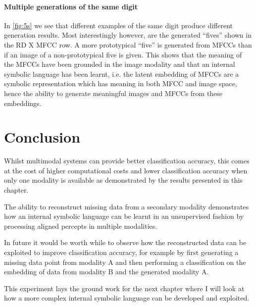 \paragraph{Multiple generations of the same digit}
In \autoref{fig:5s} we see that different examples of the same digit produce different generation results. Most interestingly however, are the generated ``fives'' shown in the RD X MFCC row. A more prototypical ``five'' is generated from MFCCs than if an image of a non-prototypical five is given. This shows that the meaning of the MFCCs have been grounded in the image modality and that an internal symbolic language has been learnt, i.e. the latent embedding of MFCCs are a symbolic representation which has meaning in both MFCC and image space, hence the ability to generate meaningful images and MFCCs from these embeddings.

\section{Conclusion}
Whilst multimodal systems can provide better classification accuracy, this comes at the cost of higher computational costs and lower classification accuracy when only one modality is available as demonstrated by the results presented in this chapter.

The ability to reconstruct missing data from a secondary modality demonstrates how an internal symbolic language can be learnt in an unsupervised fashion by processing aligned percepts in multiple modalities.

In future it would be worth while to observe how the reconstructed data can be exploited to improve classification accuracy, for example by first generating a missing data point from modality A and then performing a classification on the embedding of data from modality B and the generated modality A.

This experiment lays the ground work for the next chapter where I will look at how a more complex internal symbolic language can be developed and exploited. 
\theendnotes